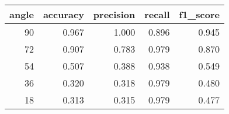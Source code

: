\begin{tabular}{rrrrr}
\toprule
angle & accuracy & precision & recall & f1_score \\
\midrule
90 & 0.967 & 1.000 & 0.896 & 0.945 \\
72 & 0.907 & 0.783 & 0.979 & 0.870 \\
54 & 0.507 & 0.388 & 0.938 & 0.549 \\
36 & 0.320 & 0.318 & 0.979 & 0.480 \\
18 & 0.313 & 0.315 & 0.979 & 0.477 \\
\bottomrule
\end{tabular}
